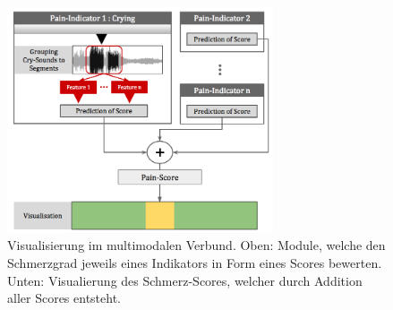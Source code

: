 \begin{figure}[h]
	\centering
	\includegraphics[width=0.7\textwidth]{bilder/multimodal_viz_02.png}
	\caption[Visualisierung im multimodalen Verbund]{Visualisierung im multimodalen Verbund. Oben: Module, welche den Schmerzgrad jeweils eines Indikators in Form eines Scores bewerten. Unten: Visualierung des Schmerz-Scores, welcher durch Addition aller Scores entsteht. }
	\label{img:multimodal-overview}
\end{figure}



